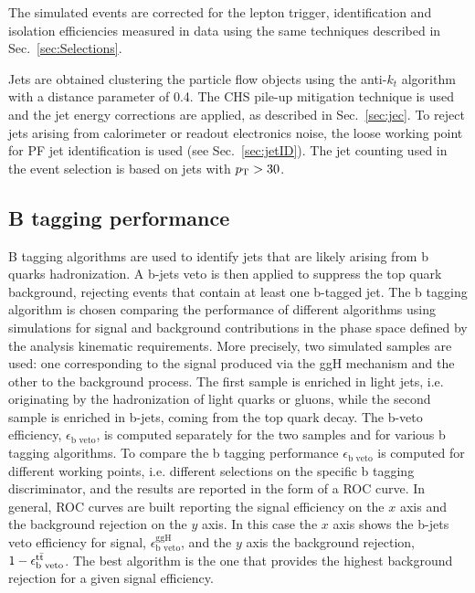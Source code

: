 The simulated events are corrected for the lepton trigger, identification and isolation efficiencies measured in data using the same techniques described in Sec.~\ref{sec:Selections}.

Jets are obtained clustering the particle flow objects using the anti-$k_t$ algorithm with a distance parameter of 0.4. The CHS pile-up mitigation technique is used and the jet energy corrections are applied, as described in Sec.~\ref{sec:jec}. 
To reject jets arising from calorimeter or readout electronics noise, the loose working point for PF jet identification is used (see Sec.~\ref{sec:jetID}). The jet counting used in the event selection is based on jets with $p_\mathrm{T}>30$\GeV.

\subsection{B tagging performance}

B tagging algorithms are used to identify jets that are likely arising from b quarks hadronization. A b-jets veto is then applied to suppress the top quark background, rejecting events that contain at least one b-tagged jet.
The b tagging algorithm is chosen comparing the performance of different algorithms using simulations for signal and background contributions in the phase space defined by the analysis kinematic requirements. More precisely, two simulated samples are used: one corresponding to the \hwwllnn signal produced via the ggH mechanism and the other to the \ttbar background process. The first sample is enriched in light jets, i.e. originating by the hadronization of light quarks or gluons, while the second sample is enriched in b-jets, coming from the top quark decay. The b-veto efficiency, $\epsilon_\text{b veto}$, is computed separately for the two samples and for various b tagging algorithms. To compare the b tagging performance $\epsilon_\text{b veto}$ is computed for different working points, i.e. different selections on the specific b tagging discriminator, and the results are reported in the form of a ROC curve. In general, ROC curves are built reporting the signal efficiency on the $x$ axis and the background rejection on the $y$ axis. In this case the $x$ axis shows the b-jets veto efficiency for signal, $\epsilon_\text{b veto}^\text{ggH}$, and the $y$ axis the \ttbar background rejection, $1-\epsilon_\text{b veto}^{\mathrm{t}\bar{\mathrm{t}}}$. The best algorithm is the one that provides the highest background rejection for a given signal efficiency. 

